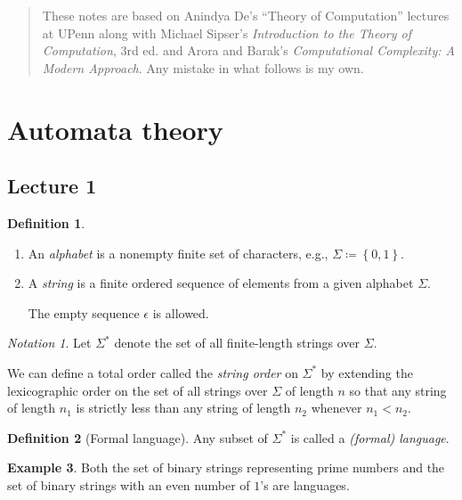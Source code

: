\documentclass[10pt,letterpaper,cm]{nupset}
\theoremstyle{definition}
\newtheorem{definition}{Definition}[subsection]
\newtheorem{exmp}[definition]{Example}
\theoremstyle{theorem}
\theoremstyle{remark}
\newtheorem*{notation}{Notation}
\newcommand{\1}{\mathbf{1}}
\newcommand{\0}{\vec 0}
\begin{document}
\thispagestyle{empty}
\begin{abstract}
These notes are based on Anindya De's ``Theory of Computation'' lectures at UPenn along with Michael Sipser's \textit{Introduction to the Theory of Computation}, 3rd ed. and Arora and Barak's \textit{Computational Complexity: A Modern Approach}. Any mistake in what follows is my own.
\end{abstract}

\tableofcontents
\newpage

\section{Automata theory}

\subsection{Lecture 1}

\begin{definition} $ $
\begin{enumerate}
\item An \textit{alphabet} is a nonempty finite set of characters, e.g., $\Sigma \coloneqq \left\{0,1\right\}$. 
\item A \textit{string} is a finite ordered sequence of elements from a given alphabet $\Sigma$. 

The empty sequence $\epsilon$ is allowed.
\end{enumerate}
\end{definition}

\begin{notation}
Let $\Sigma^{\ast}$ denote the set of all finite-length strings over $\Sigma$. 
\end{notation}

We can define a total order called the \textit{string order} on $\Sigma^{\ast}$ by extending the  lexicographic order on the set of all strings over $\Sigma$ of length $n$ so that any string of length $n_1$ is strictly less than any string of length $n_2$ whenever $n_1<n_2$.

\begin{definition}[Formal language]
Any subset of $\Sigma^{\ast}$ is called a \textit{(formal) language}.
\end{definition}

\begin{exmp}
Both the set of binary strings representing prime numbers and the set of binary strings with an even number of $1$'s are languages. 
\end{exmp}
\end{document}

